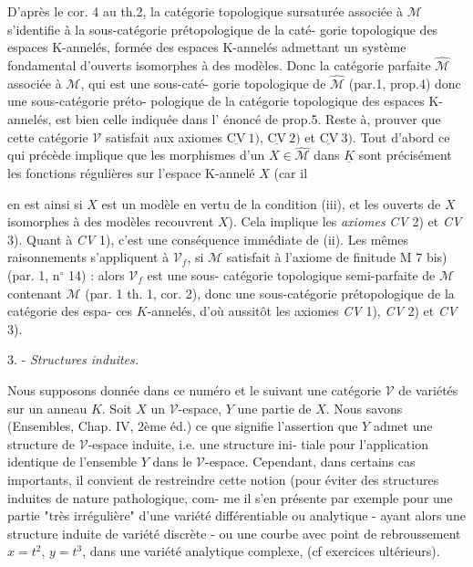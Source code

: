 D'après le cor. 4 au th.2, la catégorie topologique sursaturée
associée à $\mathcal{M}$ s'identifie à la sous-catégorie prétopologique de la caté-
gorie topologique des espaces K-annelés, formée des espaces K-annelés
admettant un système fondamental d'ouverts isomorphes à des modèles.
Donc la catégorie parfaite $\hat{\mathcal{M}}$ associée à $\mathcal{M}$, qui est une sous-caté-
gorie topologique de $\hat{\mathcal{M}}$ (par.1, prop.4) donc une sous-catégorie préto-
pologique de la catégorie topologique des espaces K-annelés, est bien
celle indiquée dans l' énoncé de prop.5. Reste à, prouver que cette
catégorie $\mathcal{V}$ satisfait aux axiomes $\underline{\text{CV}}\ 1)$, $\underline{\text{CV}}\ 2)$ et $\underline{\text{CV}}\ 3)$. Tout d'abord
ce qui précède implique que les morphismes d'un $X \in \hat{\mathcal{M}}$ dans $\underline{K}$ sont
précisément les fonctions régulières sur l'espace K-annelé $X$ (car il

\newpage



en est ainsi si $X$ est un modèle en vertu de la condition (iii), et les
ouverts de $X$ isomorphes à des modèles recouvrent $X$). Cela implique les
\emph{axiomes} \emph{CV} 2) et \emph{CV} 3). Quant à \emph{CV} 1), c'est une conséquence immédiate
de (ii). Les mêmes raisonnements s'appliquent à $\mathcal{V}_f$, si $\mathcal{M}$ satisfait
à l'axiome de finitude M 7 bis) (par. 1, n$^\circ$ 14) : alors $\mathcal{V}_f$ est une sous-
catégorie topologique semi-parfaite de $\mathcal{M}$ contenant $\mathcal{M}$ (par. 1 th. 1,
cor. 2), donc une sous-catégorie prétopologique de la catégorie des espa-
ces $K$-annelés, d'où aussitôt les axiomes \emph{CV} 1), \emph{CV} 2) et \emph{CV} 3).

3. - \emph{Structures induites.}

Nous supposons donnée dans ce numéro et le suivant une catégorie $\mathcal{V}$
de variétés sur un anneau $K$. Soit $X$ un $\mathcal{V}$-espace, $Y$ une partie de $X$.
Nous savons (Ensembles, Chap. IV, 2ème éd.) ce que signifie l'assertion
que $Y$ admet une structure de $\mathcal{V}$-espace induite, i.e. une structure ini-
tiale pour l'application identique de l'ensemble $Y$ dans le $\mathcal{V}$-espace.
Cependant, dans certains cas importants, il convient de restreindre cette
notion (pour éviter des structures induites de nature pathologique, com-
me il s'en présente par exemple pour une partie "très irrégulière" d'une
variété différentiable ou analytique - ayant alors une structure induite
de variété discrète - ou une courbe avec point de rebroussement $x=t^2$,
$y=t^3$, dans une variété analytique complexe, (cf exercices ultérieurs).

